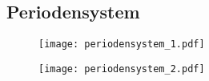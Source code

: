 \begin{appendices}
	\clearpage
	\chapter{Periodensystem}
	
	\begin{figure}\label{fig:persys}
		\centering
		\texttt{[image: periodensystem\_1.pdf]}
	\end{figure}	

	\begin{figure}
		\centering
		\texttt{[image: periodensystem\_2.pdf]}
	\end{figure}

\end{appendices}
